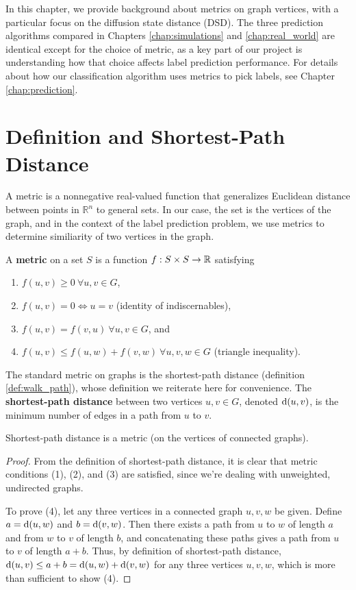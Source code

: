 In this chapter, we provide background about metrics on graph vertices, with a particular focus on
the diffusion state distance (DSD). The three prediction algorithms compared in Chapters
\ref{chap:simulations} and \ref{chap:real_world} are identical except for the choice of metric, as a
key part of our project is understanding how that choice affects label prediction performance. For
details about how our classification algorithm uses metrics to pick labels, see Chapter
\ref{chap:prediction}.


\section{Definition and Shortest-Path Distance}

A metric is a nonnegative real-valued function that generalizes Euclidean distance between points in
$\mathbb{R}^n$ to general sets. In our case, the set is the vertices of the graph, and in the context of the
label prediction problem, we use metrics to determine similiarity of two vertices in the graph.

\begin{definition}
  A \textbf{metric} on a set $S$ is a function $f : S \times S \to \mathbb{R}$
  satisfying

  \begin{enumerate}
  \item $f(u,v)\geq 0 ~ \forall u,v \in G$,
  \item $f(u,v) = 0 \iff u = v$ (identity of indiscernables),
  \item $f(u,v) = f(v,u) ~\forall u,v \in G$, and
  \item $f(u,v) \leq f(u,w) + f(v,w) ~\forall u,v,w \in G$
    (triangle inequality).
  \end{enumerate}
\end{definition}

The standard metric on graphs is the shortest-path distance (definition \ref{def:walk_path}), whose
definition we reiterate here for convenience. The \textbf{shortest-path distance} between two
vertices $u,v \in G$, denoted $\mathrm{d}(u,v)$, is the minimum number of edges in a path from $u$ to $v$.

\begin{proposition}
  Shortest-path distance is a metric (on the vertices of connected graphs).
\end{proposition}

\begin{proof}
  From the definition of shortest-path distance, it is clear that metric conditions (1), (2),
  and (3) are satisfied, since we're dealing with unweighted, undirected graphs.

  To prove (4), let any three vertices in a connected graph $u,v,w$ be given. Define $a=\mathrm{d}(u,w)$
  and $b=\mathrm{d}(v,w)$. Then there exists a path from $u$ to $w$ of length $a$ and from $w$ to $v$ of
  length $b$, and concatenating these paths gives a path from $u$ to $v$ of length $a+b$. Thus, by
  definition of shortest-path distance, $\mathrm{d}(u,v) \leq a + b = \mathrm{d}(u,w) + \mathrm{d}(v,w)$ for any three
  vertices $u,v,w$, which is more than sufficient to show (4).
\end{proof}


